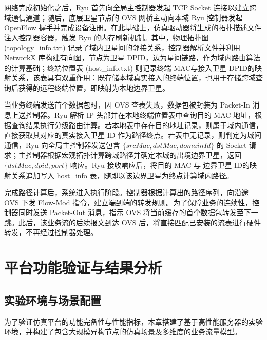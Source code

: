 \documentclass[print, master, vlined]{DissertUESTC}
\begin{document}
    网络完成初始化之后，Ryu 首先向全局主控制器发起 TCP Socket 连接以建立跨域通信通道；随后，底层卫星节点的 OVS 网桥主动向本域 Ryu 控制器发起 OpenFlow 握手并完成设备注册。在此基础上，仿真驱动器将生成的拓扑描述文件注入控制器容器，触发 Ryu 的内存刷新机制。其中，物理拓扑图 (topology\_info.txt) 记录了域内卫星间的邻接关系，控制器解析文件并利用 NetworkX 库构建有向图，节点为卫星 DPID，边为星间链路，作为域内路由算法的计算基础；终端位置表 (host\_info.txt) 则记录终端 MAC与接入卫星 DPID的映射关系，该表具有双重作用：既存储本域真实接入的终端位置，也用于存储跨域查询后获得的远程终端位置，即映射为本地边界卫星。

    当业务终端发送首个数据包时，因 OVS 查表失败，数据包被封装为 Packet-In 消息上送控制器。Ryu 解析 IP 头部并在本地终端位置表中查询目的 MAC 地址，根据查询结果执行分级路由计算。若本地表中存在目的地址记录，则属于域内通信，直接获取其对应的真实接入卫星 ID 作为路径终点。若表中无记录，则判定为域间通信，Ryu 向全局主控制器发送包含 $\{srcMac, dstMac, domainId\}$ 的 Socket 请求；主控制器根据宏观拓扑计算跨域路径并确定本域的出境边界卫星，返回 $\{dstMac, dpid, port\}$ 响应。Ryu 接收响应后，将目的 MAC 与 边界卫星 ID的映射关系追加写入 host\_info 表，随即以该边界卫星为终点计算域内路径。

    完成路径计算后，系统进入执行阶段。控制器根据计算出的路径序列，向沿途 OVS 下发 Flow-Mod 指令，建立端到端的转发规则。为了保障业务的连续性，控制器同时发送 Packet-Out 消息，指示 OVS 将当前缓存的首个数据包转发至下一跳。此后，该业务流的后续报文到达 OVS 后，将直接匹配已安装的流表进行硬件转发，不再经过控制器处理。

    \section{平台功能验证与结果分析}

    \subsection{实验环境与场景配置}
    为了验证仿真平台的功能完备性与性能指标，本章搭建了基于高性能服务器的实验环境，并构建了包含大规模异构节点的仿真场景及多维度的业务流量模型。
    
\end{document}
